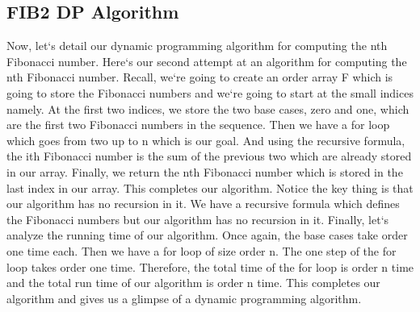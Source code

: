 \subsection{FIB2  DP Algorithm}
Now, let`s detail our dynamic programming algorithm for computing the nth Fibonacci number.
Here`s our second attempt at an algorithm for computing the nth Fibonacci number.
Recall, we`re going to create an order array F which is going to store the Fibonacci numbers and we`re going to start at the small indices namely.
At the first two indices, we store the two base cases, zero and one, which are the first two Fibonacci numbers in the sequence.
Then we have a for loop which goes from two up to n which is our goal.
And using the recursive formula, the ith Fibonacci number is the sum of the previous two which are already stored in our array.
Finally, we return the nth Fibonacci number which is stored in the last index in our array.
This completes our algorithm.
Notice the key thing is that our algorithm has no recursion in it.
We have a recursive formula which defines the Fibonacci numbers but our algorithm has no recursion in it.
Finally, let`s analyze the running time of our algorithm.
Once again, the base cases take order one time each.
Then we have a for loop of size order n.
The one step of the for loop takes order one time.
Therefore, the total time of the for loop is order n time and the total run time of our algorithm is order n time.
This completes our algorithm and gives us a glimpse of a dynamic programming algorithm.

